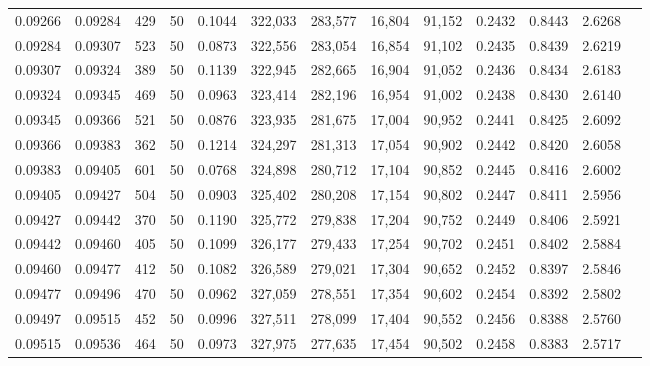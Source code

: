 \begin{tabular}{rrrrrrrrrrrrr}
0.09266 & 0.09284 &   429 &  50 &                                     0.1044 & 322,033 & 283,577 &  16,804 &  91,152 & 0.2432 & 0.8443 & 2.6268 \\
0.09284 & 0.09307 &   523 &  50 &                                     0.0873 & 322,556 & 283,054 &  16,854 &  91,102 & 0.2435 & 0.8439 & 2.6219 \\
0.09307 & 0.09324 &   389 &  50 &                                     0.1139 & 322,945 & 282,665 &  16,904 &  91,052 & 0.2436 & 0.8434 & 2.6183 \\
0.09324 & 0.09345 &   469 &  50 &                                     0.0963 & 323,414 & 282,196 &  16,954 &  91,002 & 0.2438 & 0.8430 & 2.6140 \\
0.09345 & 0.09366 &   521 &  50 &                                     0.0876 & 323,935 & 281,675 &  17,004 &  90,952 & 0.2441 & 0.8425 & 2.6092 \\
0.09366 & 0.09383 &   362 &  50 &                                     0.1214 & 324,297 & 281,313 &  17,054 &  90,902 & 0.2442 & 0.8420 & 2.6058 \\
0.09383 & 0.09405 &   601 &  50 &                                     0.0768 & 324,898 & 280,712 &  17,104 &  90,852 & 0.2445 & 0.8416 & 2.6002 \\
0.09405 & 0.09427 &   504 &  50 &                                     0.0903 & 325,402 & 280,208 &  17,154 &  90,802 & 0.2447 & 0.8411 & 2.5956 \\
0.09427 & 0.09442 &   370 &  50 &                                     0.1190 & 325,772 & 279,838 &  17,204 &  90,752 & 0.2449 & 0.8406 & 2.5921 \\
0.09442 & 0.09460 &   405 &  50 &                                     0.1099 & 326,177 & 279,433 &  17,254 &  90,702 & 0.2451 & 0.8402 & 2.5884 \\
0.09460 & 0.09477 &   412 &  50 &                                     0.1082 & 326,589 & 279,021 &  17,304 &  90,652 & 0.2452 & 0.8397 & 2.5846 \\
0.09477 & 0.09496 &   470 &  50 &                                     0.0962 & 327,059 & 278,551 &  17,354 &  90,602 & 0.2454 & 0.8392 & 2.5802 \\
0.09497 & 0.09515 &   452 &  50 &                                     0.0996 & 327,511 & 278,099 &  17,404 &  90,552 & 0.2456 & 0.8388 & 2.5760 \\
0.09515 & 0.09536 &   464 &  50 &                                     0.0973 & 327,975 & 277,635 &  17,454 &  90,502 & 0.2458 & 0.8383 & 2.5717 \\

\end{tabular}
